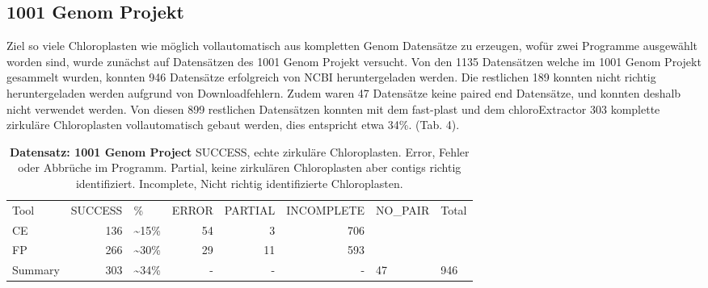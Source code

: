 \documentclass{scrartcl}
\begin{document}
\subsection{1001 Genom Projekt}
\label{sec-3-6}
Ziel so viele Chloroplasten wie möglich vollautomatisch aus kompletten Genom Datensätze zu erzeugen, wofür zwei Programme ausgewählt worden sind, wurde zunächst auf Datensätzen 
des 1001 Genom Projekt versucht.
Von den 1135 Datensätzen welche im 1001 Genom Projekt gesammelt wurden, konnten 946 Datensätze erfolgreich von NCBI heruntergeladen werden. Die restlichen 189 konnten nicht richtig heruntergeladen werden aufgrund von Downloadfehlern. 
Zudem waren 47 Datensätze keine paired end Datensätze, und konnten deshalb nicht verwendet werden. Von diesen 899 restlichen Datensätzen konnten mit dem fast-plast und dem chloroExtractor 303 komplette zirkuläre Chloroplasten 
vollautomatisch gebaut werden, dies entspricht etwa 34\%. (Tab. 4). 
\begin{table}[!h]
\caption[Datensatz: 1001 Genom Project]{\textbf{Datensatz: 1001 Genom Project} SUCCESS, echte zirkuläre Chloroplasten. Error, Fehler oder Abbrüche im Programm. Partial, keine zirkulären Chloroplasten aber contigs richtig identifiziert. Incomplete, Nicht richtig identifizierte Chloroplasten.}
\begin{center}
\begin{tabular}{lrlrrrll}
Tool & SUCCESS & \% & ERROR & PARTIAL & INCOMPLETE & NO\_PAIR & Total\\
CE & 136 & \textasciitilde{}15\% & 54 & 3 & 706 &  & \\
FP & 266 & \textasciitilde{}30\% & 29 & 11 & 593 &  & \\
Summary & 303 & \textasciitilde{}34\% & - & - & - & 47 & 946\\
\end{tabular}
\end{center}
\end{table}
\end{document}
